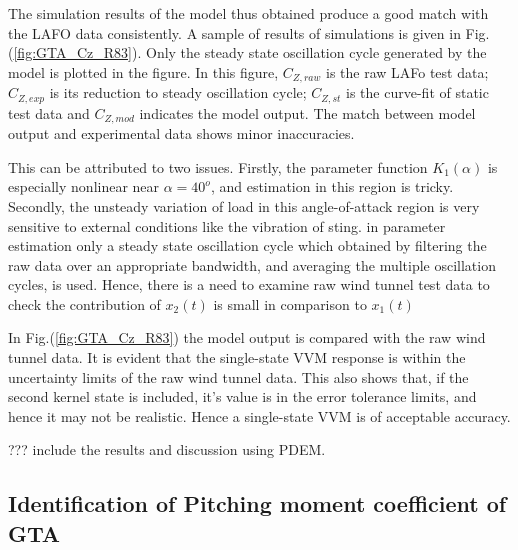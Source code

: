 \documentclass{AIAA}
\begin{document}
The simulation results of the model thus obtained produce a good match with the LAFO data consistently. A sample of results of simulations is given in Fig.(\ref{fig:GTA_Cz_R83}). Only the steady state oscillation cycle generated by the model is plotted in the figure. In this figure, $C_{Z,raw}$ is the raw LAFo test data; $C_{Z,exp}$ is its reduction to steady oscillation cycle; $C_{Z,st}$ is the curve-fit of static test data and $C_{Z,mod}$ indicates the model output. The match between model output and experimental data shows minor inaccuracies.

This can be attributed to two issues. Firstly, the parameter function $K_1(\alpha)$ is especially nonlinear near $\alpha=40^o$, and estimation in this region is tricky. Secondly, the unsteady variation of load in this angle-of-attack region is very sensitive to external conditions like the vibration of sting. in parameter estimation only a steady state oscillation cycle which obtained by filtering the raw data over an appropriate bandwidth, and averaging the multiple oscillation cycles, is used. Hence, there is a need to examine raw wind tunnel test data to check the contribution of $x_2(t)$ is small in comparison to $x_1(t)$

In Fig.(\ref{fig:GTA_Cz_R83}) the model output is compared with the raw wind tunnel data. It is evident that the single-state VVM response is within the uncertainty limits of the raw wind tunnel data. This also shows that, if the second kernel state is included, it's value is in the error tolerance limits, and hence it may not be realistic. Hence a single-state VVM is of acceptable accuracy.



??? include the results and discussion using PDEM.

\subsection{Identification of Pitching moment coefficient of GTA}
\end{document}
